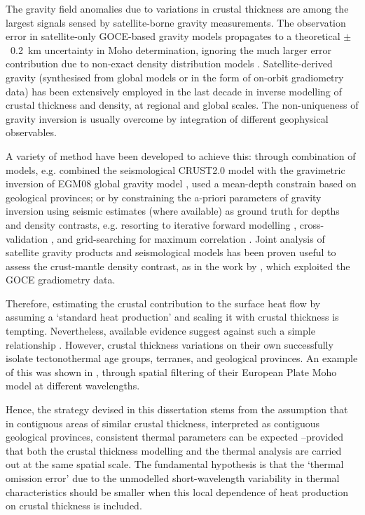 The gravity field anomalies due to variations in crustal thickness are among the largest signals sensed by satellite-borne gravity measurements.
The observation error in satellite-only GOCE-based gravity models propagates to a theoretical $\pm$~\SI{0.2}{\kilo \metre} uncertainty in Moho determination, ignoring the much larger error contribution due to non-exact density distribution models \parencites{braitenberg2011goce}{MeijdePail2020}.
Satellite-derived gravity (synthesised from global models or in the form of on-orbit gradiometry data) has been extensively employed in the last decade in inverse modelling of crustal thickness and density, at regional and global scales.
The non-uniqueness of gravity inversion is usually overcome by integration of different geophysical observables.

A variety of method have been developed to achieve this: through combination of models, e.g. \textcite{Eshagh2011} combined the seismological {CRUST2.0 model} \parencite{Bassin2000Crust20} with the gravimetric inversion of {EGM08} global gravity model \parencite{Pavlis2012EGM2008}, \textcite{Reguzzoni2015} used a mean-depth constrain based on geological provinces; or by constraining the a-priori parameters of gravity inversion using seismic estimates (where available) as ground truth for depths and density contrasts, e.g. resorting to iterative forward modelling \parencite{Ebbing2006}, cross-validation \parencite{Uieda2017}, and grid-searching for maximum correlation \parencite{Zhao2020}.
Joint analysis of satellite gravity products and seismological models has been proven useful to assess the crust-mantle density contrast, as in the work by \textcite{Eshagh2016contrast}, which exploited the GOCE gradiometry data.

Therefore, estimating the crustal contribution to the surface heat flow by assuming a `standard heat production' and scaling it with crustal thickness is tempting.
Nevertheless, available evidence suggest against such a simple relationship \parencites{Mareschal2013}{Alessio2018deepRHP}.
However, crustal thickness variations on their own successfully isolate tectonothermal age groups, terranes, and geological provinces.
An example of this was shown in \textcite{Grad2009}, through spatial filtering of their European Plate Moho model at different wavelengths.

Hence, the strategy devised in this dissertation stems from the assumption that in contiguous areas of similar crustal thickness, interpreted as contiguous geological provinces, consistent thermal parameters can be expected --provided that both the crustal thickness modelling and the thermal analysis are carried out at the same spatial scale.
The fundamental hypothesis is that the `thermal omission error' due to the unmodelled short-wavelength variability in thermal characteristics should be smaller when this local dependence of heat production on crustal thickness is included.

